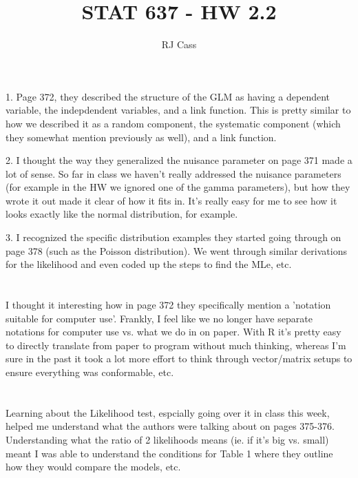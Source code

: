 \documentclass{article}
\author{RJ Cass}
\title{STAT 637 - HW 2.2}
\begin{document}
\maketitle

\section{}

1. Page 372, they described the structure of the GLM as having a dependent variable, the indepdendent variables, and a link function. This is pretty similar to how we described it as a random component, the systematic component (which they somewhat mention previously as well), and a link function.

2. I thought the way they generalized the nuisance parameter on page 371 made a lot of sense. So far in class we haven't really addressed the nuisance parameters (for example in the HW we ignored one of the gamma parameters), but how they wrote it out made it clear of how it fits in. It's really easy for me to see how it looks exactly like the normal distribution, for example. 

3. I recognized the specific distribution examples they started going through on page 378 (such as the Poisson distribution). We went through similar derivations for the likelihood and even coded up the steps to find the MLe, etc. 

\section{}

I thought it interesting how in page 372 they specifically mention a 'notation suitable for computer use'. Frankly, I feel like we no longer have separate notations for computer use vs. what we do in on paper. With R it's pretty easy to directly translate from paper to program without much thinking, whereas I'm sure in the past it took a lot more effort to think through vector/matrix setups to ensure everything was conformable, etc. 

\section{}

Learning about the Likelihood test, espcially going over it in class this week, helped me understand what the authors were talking about on pages 375-376. Understanding what the ratio of 2 likelihoods means (ie. if it's big vs. small) meant I was able to understand the conditions for Table 1 where they outline how they would compare the models, etc. 
\end{document}
